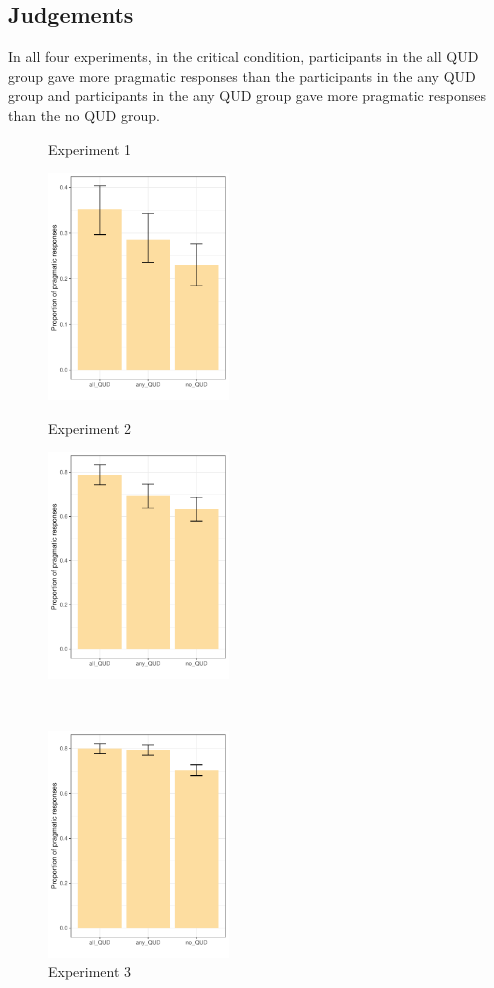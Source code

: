 \documentclass[12pt]{article}
\begin{document}
    \subsection*{Judgements}

In all four experiments, in the critical condition, participants in the all QUD group gave more pragmatic responses than the participants in the any QUD group and participants in the any QUD group gave more pragmatic responses than the no QUD group.  
\\
\begin{figure}[!h]  
    \begin{minipage}{.5\textwidth}
        \caption*{Experiment 1}
        \includegraphics[height=6cm]{img/exp1_proportion_pragmatic.pdf}
    \end{minipage}%
    \begin{minipage}{.5\textwidth}
        \caption*{Experiment 2}
        \includegraphics[height=6cm]{img/exp2_proportion_pragmatic.pdf}    
    \end{minipage}%
    \\
    \begin{minipage}{.5\textwidth}
        \caption*{Experiment 3}
        \includegraphics[height=6cm]{img/exp3_proportion_pragmatic.pdf}    

\end{minipage}
\end{figure}
\end{document}
